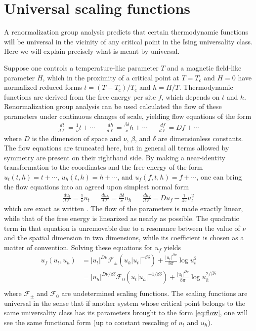 \documentclass[
  aps,
  pre,
  preprint,
  longbibliography,
  floatfix
]{revtex4-2}
\begin{document}
\section{Universal scaling functions}

A renormalization group analysis predicts that certain thermodynamic functions
will be universal in the vicinity of any critical point in the Ising
universality class. Here we will explain precisely what is meant by universal.

Suppose one controls a temperature-like parameter $T$ and a magnetic field-like
parameter $H$, which in the proximity of a critical point at $T=T_c$ and $H=0$
have normalized reduced forms $t=(T-T_c)/T_c$ and $h=H/T$. Thermodynamic
functions are derived from the free energy per site $f$, which depends on $t$
and $h$. Renormalization group analysis can be used calculated the flow of
these parameters under continuous changes of scale, yielding flow equations of
the form
\begin{align} \label{eq:raw.flow}
  \frac{dt}{d\ell}=\frac1\nu t+\cdots
  &&
  \frac{dh}{d\ell}=\frac{\beta\delta}\nu h+\cdots
  &&
  \frac{df}{d\ell}=Df+\cdots
\end{align}
where $D$ is the dimension of space and $\nu$, $\beta$, and $\delta$ are
dimensionless constants. The flow equations are truncated here, but in general
all terms allowed by symmetry are present on their righthand side. By making a
near-identity transformation to the coordinates and the free energy of the form
$u_t(t, h)=t+\cdots$, $u_h(t, h)=h+\cdots$, and $u_f(f,t,h)=f+\cdots$, one can
bring the flow equations into an agreed upon simplest normal form
\begin{align} \label{eq:flow}
  \frac{du_t}{d\ell}=\frac1\nu u_t
  &&
  \frac{du_h}{d\ell}=\frac{\beta\delta}\nu u_h
  &&
  \frac{du_f}{d\ell}=Du_f-\frac1{4\pi}u_t^2
\end{align}
which are exact as written \cite{Raju_2019_Normal}. The flow of the parameters
is made exactly linear, while that of the free energy is linearized as nearly
as possible. The quadratic term in that equation is unremovable due to a
resonance between the value of $\nu$ and the spatial dimension in two
dimensions, while its coefficient is chosen as a matter of convention. Solving
these equations for $u_f$ yields
\begin{equation}
  \begin{aligned}
    u_f(u_t, u_h)
    &=|u_t|^{D\nu}\mathcal F_\pm(u_h|u_t|^{-\beta\delta})+\frac{|u_t|^{D\nu}}{8\pi}\log u_t^2 \\
    &=|u_h|^{D\nu/\beta\delta}\mathcal F_0(u_t|u_h|^{-1/\beta\delta})+\frac{|u_t|^{D\nu}}{8\pi}\log u_h^{2/\beta\delta} \\
  \end{aligned}
\end{equation}
where $\mathcal F_\pm$ and $\mathcal F_0$ are undetermined scaling functions.
The scaling functions are universal in the sense that if another system whose
critical point belongs to the same universality class has its parameters
brought to the form \eqref{eq:flow}, one will see the same functional form (up
to constant rescaling of $u_t$ and $u_h$).
\end{document}
